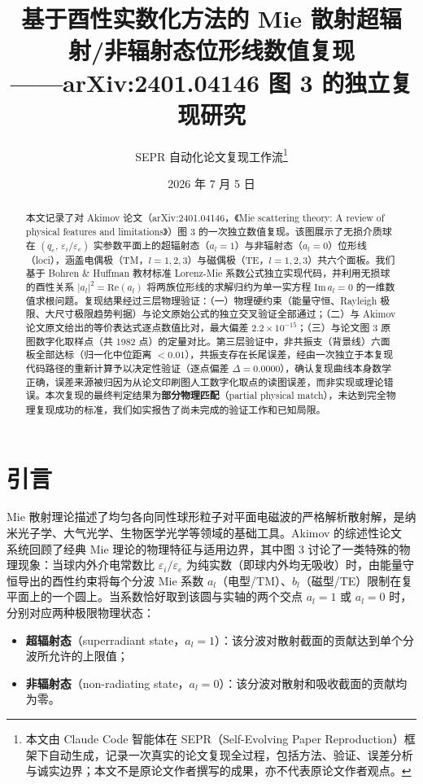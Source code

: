 \documentclass[12pt]{ctexart}
\title{\Large 基于酉性实数化方法的 Mie 散射超辐射/非辐射态位形线数值复现\\
\large ——arXiv:2401.04146 图 3 的独立复现研究}
\author{SEPR 自动化论文复现工作流\thanks{本文由 Claude Code 智能体在 SEPR（Self-Evolving Paper Reproduction）框架下自动生成，记录一次真实的论文复现全过程，包括方法、验证、误差分析与诚实边界；本文不是原论文作者撰写的成果，亦不代表原论文作者观点。}}
\date{2026 年 7 月 5 日}
\begin{document}
\maketitle

\begin{abstract}
本文记录了对 Akimov 论文（arXiv:2401.04146，《Mie scattering theory: A review of physical features and limitations》）图 3 的一次独立数值复现。该图展示了无损介质球在 $(q_e,\, \varepsilon_i/\varepsilon_e)$ 实参数平面上的超辐射态（$a_l=1$）与非辐射态（$a_l=0$）位形线（loci），涵盖电偶极（TM，$l=1,2,3$）与磁偶极（TE，$l=1,2,3$）共六个面板。我们基于 Bohren \& Huffman 教材标准 Lorenz-Mie 系数公式独立实现代码，并利用无损球的酉性关系 $|a_l|^2=\mathrm{Re}(a_l)$ 将两族位形线的求解归约为单一实方程 $\mathrm{Im}\,a_l=0$ 的一维数值求根问题。复现结果经过三层物理验证：（一）物理硬约束（能量守恒、Rayleigh 极限、大尺寸极限趋势判据）与论文原始公式的独立交叉验证全部通过；（二）与 Akimov 论文原文给出的等价表达式逐点数值比对，最大偏差 $2.2\times10^{-15}$；（三）与论文图 3 原图数字化取样点（共 1982 点）的定量对比。第三层验证中，非共振支（背景线）六面板全部达标（归一化中位距离 $<0.01$），共振支存在长尾误差，经由一次独立于本复现代码路径的重新计算予以决定性验证（逐点偏差 $\Delta=0.0000$），确认复现曲线本身数学正确，误差来源被归因为从论文印刷图人工数字化取点的读图误差，而非实现或理论错误。本次复现的最终判定结果为\textbf{部分物理匹配}（partial physical match），未达到完全物理复现成功的标准，我们如实报告了尚未完成的验证工作和已知局限。
\end{abstract}

\tableofcontents

\section{引言}

Mie 散射理论描述了均匀各向同性球形粒子对平面电磁波的严格解析散射解，是纳米光子学、大气光学、生物医学光学等领域的基础工具。Akimov 的综述性论文 \cite{akimov2024} 系统回顾了经典 Mie 理论的物理特征与适用边界，其中图 3 讨论了一类特殊的物理现象：当球内外介电常数比 $\varepsilon_i/\varepsilon_e$ 为纯实数（即球内外均无吸收）时，由能量守恒导出的酉性约束将每个分波 Mie 系数 $a_l$（电型/TM）、$b_l$（磁型/TE）限制在复平面上的一个圆上。当系数恰好取到该圆与实轴的两个交点 $a_l=1$ 或 $a_l=0$ 时，分别对应两种极限物理状态：

\begin{itemize}
  \item \textbf{超辐射态}（superradiant state，$a_l=1$）：该分波对散射截面的贡献达到单个分波所允许的上限值；
  \item \textbf{非辐射态}（non-radiating state，$a_l=0$）：该分波对散射和吸收截面的贡献均为零。
\end{itemize}
\end{document}
